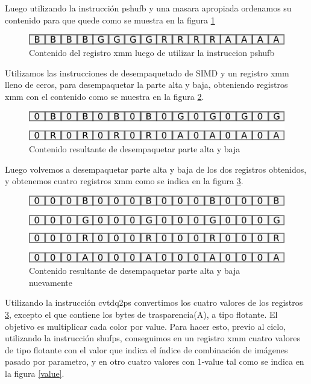 \documentclass[a4paper]{article}
\begin{document}
Luego utilizando la instrucción pshufb y una masara apropiada ordenamos su contenido para que quede como se muestra en la figura \ref{segundoXmm}

\begin{figure}[H]
\centering
\includegraphics[scale=0.8]{imagenes/segundoXmm.png}
\caption{Contenido del registro xmm luego de utilizar la instruccion pshufb}
\label{segundoXmm}
\end{figure}

Utilizamos las instrucciones de desempaquetado de SIMD y un registro xmm lleno de ceros, para desempaquetar la parte alta y baja, obteniendo registros xmm con el contenido como se muestra en la figura \ref{tercerXmm}.


\begin{figure}[H]
\centering
\includegraphics[scale=0.8]{imagenes/tecerXmm.png}
\caption{Contenido resultante de desempaquetar parte alta y baja}
\label{tercerXmm}
\end{figure}

Luego volvemos a desempaquetar parte alta y baja de los dos registros obtenidos, y obtenemos cuatro registros xmm como se indica en la figura \ref{cuartoXmm}.


\begin{figure}[H]
\centering
\includegraphics[scale=0.8]{imagenes/cuartoXmm.png}
\caption{Contenido resultante de desempaquetar parte alta y baja nuevamente}
\label{cuartoXmm}
\end{figure}

Utilizando la instrucción cvtdq2ps convertimos los cuatro valores de los registros \ref{cuartoXmm}, excepto el que contiene los bytes de trasparencia(A), a tipo flotante. El objetivo es multiplicar cada color por value. Para hacer esto, previo al ciclo, utilizando la instrucción shufps, conseguimos en un registro xmm cuatro valores de tipo flotante con el valor que indica el índice de combinación de imágenes pasado por parametro, y en otro cuatro valores con 1-value tal como se indica en la figura \ref{value}.
\end{document}
